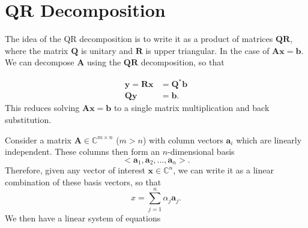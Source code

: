 \documentclass[12pt]{article}
\newcommand{\bbC}{\mathbb{C}}
\renewcommand{\vec}[1]{\mathbf{#1}}
\theoremstyle{definition}
\theoremstyle{remark}
\numberwithin{equation}{section}
\begin{document}



\section{QR Decomposition}%
\label{sec:qr_decomposition}

The idea of the QR decomposition is to write it as a product of matrices $\vec{QR}$, where the matrix $\vec{Q}$ is unitary and $\vec{R}$ is upper triangular. In the case of $\vec{Ax} = \vec{b}$. We can decompose $\vec{A}$ using the $\vec{QR}$ decomposition, so that 

\begin{align}
  \vec{y} =\vec{Rx} &= \vec{Q}^*\vec{b}\\
  \vec{Qy} &= \vec{b}.
\end{align}
This reduces solving $\vec{Ax}=\vec{b}$ to a single matrix multiplication and back substitution.

Consider a matrix $\vec{A} \in \bbC^{m\times n}$ ($m>n$) with column vectors $\vec{a}_i$ which are linearly independent. These columns then form an $n$-dimensional basis
\begin{equation}
  < \vec{a}_1, \vec{a}_2, \ldots, \vec{a}_n>.
\end{equation} Therefore, given any vector of interest $\vec{x}\in \bbC^n$, we can write it as a linear combination of these basis vectors, so that 
\begin{equation}
  x = \sum_{j=1}^{n} \alpha_j \vec{a}_j.
\end{equation} We then have a linear system of equations
\end{document}
